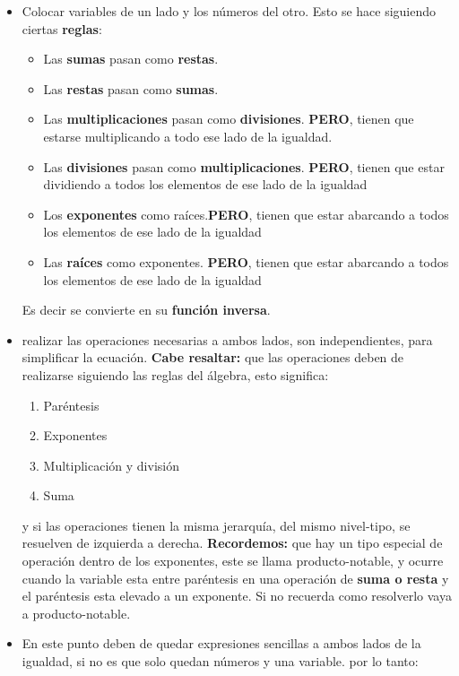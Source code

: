 \documentclass[12pt]{article}
\begin{document}
\begin{itemize}
    \item Colocar variables de un lado y los  números del otro. Esto se hace
        siguiendo ciertas \textbf{reglas}:
        \begin{itemize}
            \item Las \textbf{sumas} pasan como \textbf{restas}.
            \item Las \textbf{restas} pasan como \textbf{sumas}.
            \item Las \textbf{multiplicaciones} pasan como \textbf{divisiones}.
                \textbf{PERO}, tienen que estarse multiplicando a todo ese lado
                de la igualdad.
            \item Las \textbf{divisiones} pasan como \textbf{multiplicaciones}.
                \textbf{PERO}, tienen que estar dividiendo a todos los elementos
                de ese lado de la igualdad
            \item Los \textbf{exponentes} como raíces.\textbf{PERO}, tienen que
                estar abarcando a todos los elementos
                de ese lado de la igualdad
            \item Las \textbf{raíces} como exponentes. \textbf{PERO}, tienen que
                estar abarcando a todos los elementos
                de ese lado de la igualdad
        \end{itemize}
        Es decir se convierte en su \textbf{función inversa}.

    \item realizar las operaciones necesarias a ambos lados, son independientes,
        para simplificar la ecuación. \textbf{Cabe resaltar: }que las operaciones
        deben de realizarse siguiendo las reglas del álgebra, esto significa:
        \begin{enumerate}
            \item Paréntesis
            \item Exponentes
            \item Multiplicación y división
            \item Suma
        \end{enumerate}

        y si las operaciones tienen la misma jerarquía, del mismo nivel-tipo, se
        resuelven de izquierda a derecha.
        \textbf{Recordemos: } que hay un tipo especial de operación dentro de los
        exponentes, este se llama \refname{producto-notable}, y ocurre cuando la
        variable esta entre paréntesis en una operación de \textbf{suma o resta}
        y el paréntesis esta elevado a un exponente. Si no recuerda como resolverlo
        vaya a \refname{producto-notable}.
    \item En este punto deben de quedar expresiones sencillas a ambos lados de
        la igualdad, si no es que solo quedan números y una variable. por lo tanto:


\end{itemize}
\end{document}
